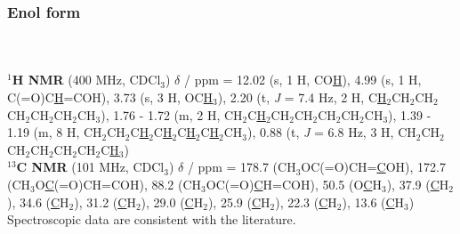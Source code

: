 \subsubsection*{Enol form }
\\[1\baselineskip]
\\[1\baselineskip]
\textbf{$^{1}$H NMR} (400 MHz, CDCl$_3$) $\delta$ / ppm = 
	12.02 (s, 1 H, CO\underline{H}), 
	4.99 (s, 1 H, C(=O)C\underline{H}=COH),
	3.73 (s, 3 H, OC\underline{H}$_3$), 
	2.20 (t, \textit{J} = 7.4 Hz, 2 H, C\underline{H}$_2$CH$_2$CH$_2$CH$_2$CH$_2$CH$_2$CH$_3$), 
	1.76 - 1.72 (m, 2 H, CH$_2$C\underline{H}$_2$CH$_2$CH$_2$CH$_2$CH$_2$CH$_3$),
	1.39 - 1.19 (m, 8 H, CH$_2$CH$_2$C\underline{H}$_2$C\underline{H}$_2$C\underline{H}$_2$C\underline{H}$_2$CH$_3$), 
	0.88 (t, \textit{J} = 6.8 Hz, 3 H, CH$_2$CH$_2$CH$_2$CH$_2$CH$_2$CH$_2$C\underline{H}$_3$)
	\\[1\baselineskip]
\textbf{$^{13}$C NMR} (101 MHz, CDCl$_3$) $\delta$ / ppm = 
	178.7 (CH$_3$OC(=O)CH=\underline{C}OH), 
	172.7 (CH$_3$O\underline{C}(=O)CH=COH), 
	88.2 (CH$_3$OC\-(=O)\underline{C}H=COH), 
	50.5 (O\underline{C}H$_3$),
	37.9 (\underline{C}H$_2$), 
	34.6 (\underline{C}H$_2$), 
	31.2 (\underline{C}H$_2$), 
	29.0 (\underline{C}H$_2$), 
	25.9 (\underline{C}H$_2$), 
	22.3 (\underline{C}H$_2$), 
	13.6 (\underline{C}H$_3$)
\\[1\baselineskip]
Spectroscopic data are consistent with the literature\cite{Baker2012,Scribner1978}.


